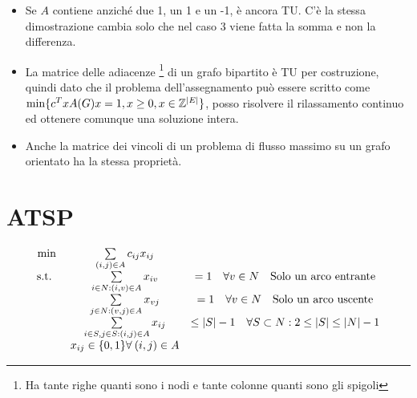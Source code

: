 \begin{itemize}
	\item Se $A$ contiene anziché due 1, un 1 e un -1, è ancora TU. C'è la stessa dimostrazione cambia solo che nel caso 3 viene fatta la somma e non la differenza.
	\item La matrice delle adiacenze \footnote{Ha tante righe quanti sono i nodi e tante colonne quanti sono gli spigoli} di un grafo bipartito è TU per costruzione, quindi dato che il problema dell'assegnamento può essere scritto come $\min \{ c^Tx A(G)x = 1, x \geq 0, x \in \mathbb{Z}^{|E|} \}$, posso risolvere il rilassamento continuo ed ottenere comunque una soluzione intera.
	\item Anche la matrice dei vincoli di un problema di flusso massimo su un grafo orientato ha la stessa proprietà.
	
\end{itemize}


\section{ATSP}

$$
\begin{matrix}
	\min \: & \sum\limits_{(i,j) \in A} c_{ij}x_{ij} & \\
	\text{s.t. } \: & \sum\limits_{i \in N : (i,v) \in A} x_{iv} &=1 \quad \forall v \in N  \quad \text{Solo un arco entrante}\\
	       & \sum\limits_{j \in N : (v,j) \in A} x_{vj} &=1 \quad \forall v \in N  \quad \text{Solo un arco uscente}\\
	       & \sum\limits_{i \in S, j \in S: (i,j) \in A} x_{ij} &\leq |S|-1 \quad \forall S \subset N : 2 \leq |S| \leq |N|-1 \\
	       & x_{ij} \in \{0,1\} \forall \: (i,j) \in A
\end{matrix}
$$

